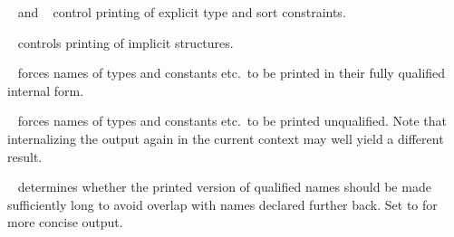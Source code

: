 \begin{isabellebody}
\begin{isamarkuptext}
  \begin{description}

  \item {}\hypertarget{antiquotation option.show-types}{\hyperlink{antiquotation option.show-types}{\mbox{}}}~ and
  \hypertarget{antiquotation option.show-sorts}{\hyperlink{antiquotation option.show-sorts}{\mbox{}}}~ control
  printing of explicit type and sort constraints.

  \item {}\hypertarget{antiquotation option.show-structs}{\hyperlink{antiquotation option.show-structs}{\mbox{}}}~
  controls printing of implicit structures.

  \item {}\hypertarget{antiquotation option.long-names}{\hyperlink{antiquotation option.long-names}{\mbox{}}}~ forces
  names of types and constants etc.\ to be printed in their fully
  qualified internal form.

  \item {}\hypertarget{antiquotation option.short-names}{\hyperlink{antiquotation option.short-names}{\mbox{}}}~
  forces names of types and constants etc.\ to be printed unqualified.
  Note that internalizing the output again in the current context may
  well yield a different result.

  \item {}\hypertarget{antiquotation option.unique-names}{\hyperlink{antiquotation option.unique-names}{\mbox{}}}~
  determines whether the printed version of qualified names should be
  made sufficiently long to avoid overlap with names declared further
  back.  Set to  for more concise output.


\end{description}
\end{isamarkuptext}
\end{isabellebody}
